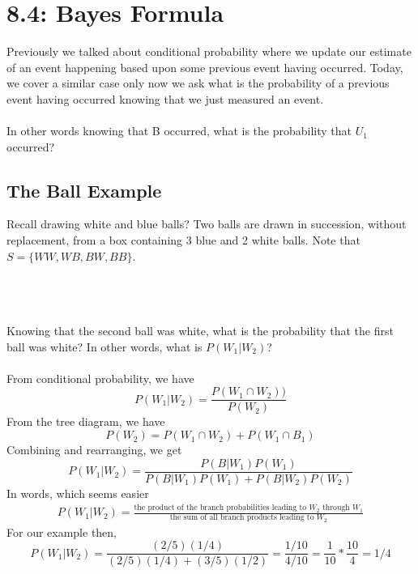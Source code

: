 \documentclass[14pt]{extarticle}
\begin{document}
\section{8.4: Bayes Formula}
Previously we talked about conditional probability where we update our estimate of an event happening based upon some previous event having occurred. Today, we cover a similar case only now we ask what is the probability of a previous event having occurred knowing that we just measured an event.
\\\\
In other words knowing that B occurred, what is the probability that $U_1$ occurred?

\subsection{The Ball Example}
Recall drawing white and blue balls? Two balls are drawn in succession, without replacement, from a box containing 3 blue and 2 white balls. Note that $S=\{WW, WB, BW, BB\}$.
\\\\
\\\\
Knowing that the second ball was white, what is the probability that the first ball was white? In other words, what is $P(W_1|W_2)$?
\\\\
From conditional probability, we have
$$P(W_1|W_2) = \frac{P(W_1 \cap W_2))}{P(W_2)}$$
From the tree diagram, we have
$$P(W_2)=P(W_1 \cap W_2) + P(W_1\cap B_1)$$
Combining and rearranging, we get
$$P(W_1|W_2) = \frac{P(B|W_1)P(W_1)}{P(B|W_1)P(W_1) + P(B|W_2)P(W_2)}$$
In words, which seems easier
\begin{align*}
	P(W_1|W_2) =
	\frac{\text{
			the product of the branch probabilities leading to $W_2$ through $W_1$}}
	{\text{
			the sum of all branch products leading to $W_2$}}
\end{align*}
For our example then,
$$P(W_1|W_2) = \frac{(2/5)(1/4)}{(2/5)(1/4) + (3/5)(1/2)} = \frac{1/10}{4/10} = \frac{1}{10}*\frac{10}{4}= 1/4$$
\end{document}
